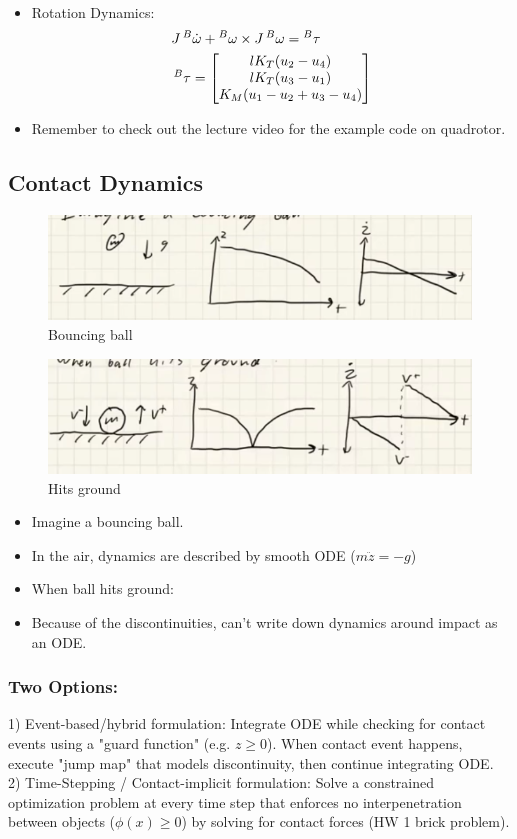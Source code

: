 \begin{itemize}
\begin{align}
    \end{align}
    \item Rotation Dynamics:
    \begin{align}
        & J \prescript{B}{}{\dot \omega} + \prescript{B}{}{\omega} \times J \prescript{B}{}{\omega} = \prescript{B}{}{\tau} \\
        & \prescript{B}{}{\tau} = 
        \begin{bmatrix}
            l K_T(u_2 - u_4) \\
            l K_T(u_3 - u_1) \\
            K_M(u_1 - u_2 + u_3 - u_4)
        \end{bmatrix}
    \end{align}
    \item Remember to check out the lecture video for the example code on quadrotor.
\end{itemize}

\subsection{Contact Dynamics}
\begin{figure}
    \centering
    \includegraphics[width=0.4\linewidth]{L12_Images/F2.PNG}
    \caption{Bouncing ball}
    \label{fig:l12f2}
\end{figure}
\begin{figure}
    \centering
    \includegraphics[width=0.4\linewidth]{L12_Images/F3.PNG}
    \caption{Hits ground}
    \label{fig:l12f3}
\end{figure}
\begin{itemize}
    \item Imagine a bouncing ball.
    \item In the air, dynamics are described by smooth ODE ($ m \ddot z = -g $)
    \item When ball hits ground:
    \item Because of the discontinuities, can't write down dynamics around impact as an ODE.
\end{itemize}

\subsubsection{Two Options:}
1) Event-based/hybrid formulation: Integrate ODE while checking for contact events using a "guard function" (e.g. $z \geq 0$). When contact event happens, execute "jump map" that models discontinuity, then continue integrating ODE. \\
2) Time-Stepping / Contact-implicit formulation: Solve a constrained optimization problem at every time step that enforces no interpenetration between objects ($\phi(x) \geq 0$) by solving for contact forces (HW 1 brick problem).

